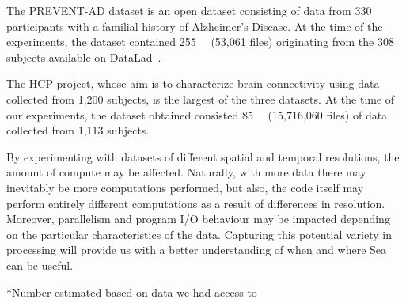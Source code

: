\documentclass[pdflatex,sn-mathphys-num]{sn-jnl}
\theoremstyle{thmstyleone}%
\theoremstyle{thmstyletwo}%
\theoremstyle{thmstylethree}%
\begin{document}
    
    The PREVENT-AD dataset is an open dataset consisting of data from 330
    participants with a familial history of Alzheimer's Disease. At the time of
    the experiments, the dataset contained \SI{255}{\giga\byte} (53,061 files)
    originating from the 308 subjects available on
    DataLad~\cite{halchenko2021datalad}.
    
    The HCP project, whose aim is to characterize brain connectivity using data
    collected from 1,200 subjects, is the largest of the three datasets. At the
    time of our experiments, the dataset obtained consisted \SI{85}{\tera\byte}
    (15,716,060 files) of data collected from 1,113 subjects.
    
    By experimenting with datasets of different spatial and temporal
    resolutions, the amount of compute may be affected. Naturally, with more
    data there may inevitably be more computations performed, but also, the code
    itself may perform entirely different computations as a result of
    differences in resolution. Moreover, parallelism and program I/O behaviour
    may be impacted depending on the particular characteristics of the data.
    Capturing this potential variety in processing will provide us with a better
    understanding of when and where Sea can be useful.
    
    \begin{table}[t]
      \centering
     \footnotesize{*Number estimated based on data we had access
    to}\\
    \caption{Dataset characteristics. Compressed size is listed, since all
    applications, except for SPM, processed compressed
    data}\label{table:sea-neuro:data}
    \end{table}
    
\end{document}
